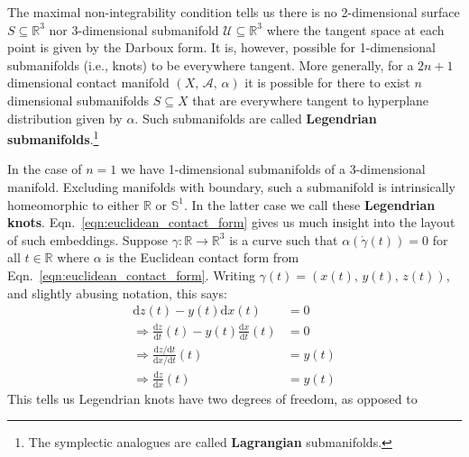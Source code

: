     \par\hfill\par
    The maximal non-integrability condition tells us there is no 2-dimensional
    surface $S\subseteq\mathbb{R}^{3}$ nor 3-dimensional submanifold
    $\mathcal{U}\subseteq\mathbb{R}^{3}$ where the tangent space at each point
    is given by the Darboux form. It is, however, possible for 1-dimensional
    submanifolds (i.e., knots) to be everywhere tangent. More generally, for
    a $2n+1$ dimensional contact manifold $(X,\,\mathcal{A},\,\alpha)$ it is
    possible for there to exist $n$ dimensional submanifolds
    $S\subseteq{X}$ that are everywhere tangent to hyperplane distribution
    given by $\alpha$. Such submanifolds
    are called \textbf{Legendrian submanifolds}.\footnote{%
        The symplectic analogues are called \textbf{Lagrangian} submanifolds.
    }
    \par\hfill\par
    In the case of $n=1$ we have 1-dimensional submanifolds of a 3-dimensional
    manifold. Excluding manifolds with boundary, such a submanifold is
    intrinsically homeomorphic to either $\mathbb{R}$ or $\mathbb{S}^{1}$.
    In the latter case we call these \textbf{Legendrian knots}.
    Eqn.~\ref{eqn:euclidean_contact_form} gives us much insight into the
    layout of such embeddings. Suppose
    $\gamma:\mathbb{R}\rightarrow\mathbb{R}^{3}$ is a curve such that
    $\alpha(\dot{\gamma}(t))=0$ for all $t\in\mathbb{R}$ where $\alpha$
    is the Euclidean contact form from Eqn.~\ref{eqn:euclidean_contact_form}.
    Writing $\gamma(t)=(x(t),\,y(t),\,z(t))$, and slightly abusing notation,
    this says:
    \begin{subequations}
        \label{eqn:euclidean_legendrian_knot_relations}
        \begin{align}
            \textrm{d}z(t)-y(t)\textrm{d}x(t)
            &=0\\
            \Rightarrow
            \frac{\textrm{d}z}{\textrm{d}t}(t)-
            y(t)\frac{\textrm{d}x}{\textrm{d}t}(t)
            &=0\\
            \Rightarrow
            \frac{\textrm{d}z/\textrm{d}t}{\textrm{d}x/\textrm{d}t}(t)
            &=y(t)\\
            \Rightarrow
            \frac{\textrm{d}z}{\textrm{d}x}(t)
            &=y(t)
        \end{align}
    \end{subequations}
    This tells us Legendrian knots have two degrees of freedom, as opposed to
